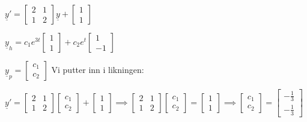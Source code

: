\documentclass[11pt, a4paper, norsk]{article}
\begin{document}
            \begin{Example}{}{}
            $\underline{y}' = \begin{bmatrix}
                2 & 1 \\
                1 & 2
            \end{bmatrix} \underline{y} + \begin{bmatrix}
                1 \\
                1
            \end{bmatrix}$ 

            $\underline{y}_{h} = c_1 e^{3t}\begin{bmatrix}
                1 \\
                1
            \end{bmatrix} + c_2e^{t}\begin{bmatrix}
                1 \\
                -1
            \end{bmatrix}$

            $\underline{y}_{p} = \begin{bmatrix}
                c_1 \\
                c_2
            \end{bmatrix}$ Vi putter inn i likningen:

            $\underline{y}' = \begin{bmatrix}
                2 & 1 \\
                1 & 2
            \end{bmatrix}\begin{bmatrix}
                c_1 \\
                c_2
            \end{bmatrix} + \begin{bmatrix}
                1 \\
                1
            \end{bmatrix} \implies \begin{bmatrix}
                2 & 1 \\
                1 & 2
            \end{bmatrix}\begin{bmatrix}
                c_1 \\
                c_2
            \end{bmatrix} = \begin{bmatrix}
                1 \\
                1
            \end{bmatrix} \implies \begin{bmatrix}
                c_1 \\
                c_2
            \end{bmatrix} = \begin{bmatrix}
                -\frac{1}{3} \\
                -\frac{1}{3}
            \end{bmatrix}$



\end{Example}
\end{document}
